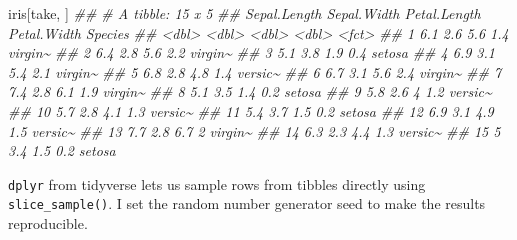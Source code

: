 \documentclass[
  notitlepage]{book}
\newenvironment{Shaded}{\begin{snugshade}}{\end{snugshade}}
\newcommand{\CommentTok}[1]{\textcolor[rgb]{0.56,0.35,0.01}{\textit{#1}}}
\newcommand{\NormalTok}[1]{#1}
\begin{document}
\begin{Shaded}
\begin{Highlighting}[]
\NormalTok{iris[take, ]}
\CommentTok{\#\# \# A tibble: 15 x 5}
\CommentTok{\#\#    Sepal.Length Sepal.Width Petal.Length Petal.Width Species}
\CommentTok{\#\#           \textless{}dbl\textgreater{}       \textless{}dbl\textgreater{}        \textless{}dbl\textgreater{}       \textless{}dbl\textgreater{} \textless{}fct\textgreater{}  }
\CommentTok{\#\#  1          6.1         2.6          5.6         1.4 virgin\textasciitilde{}}
\CommentTok{\#\#  2          6.4         2.8          5.6         2.2 virgin\textasciitilde{}}
\CommentTok{\#\#  3          5.1         3.8          1.9         0.4 setosa }
\CommentTok{\#\#  4          6.9         3.1          5.4         2.1 virgin\textasciitilde{}}
\CommentTok{\#\#  5          6.8         2.8          4.8         1.4 versic\textasciitilde{}}
\CommentTok{\#\#  6          6.7         3.1          5.6         2.4 virgin\textasciitilde{}}
\CommentTok{\#\#  7          7.4         2.8          6.1         1.9 virgin\textasciitilde{}}
\CommentTok{\#\#  8          5.1         3.5          1.4         0.2 setosa }
\CommentTok{\#\#  9          5.8         2.6          4           1.2 versic\textasciitilde{}}
\CommentTok{\#\# 10          5.7         2.8          4.1         1.3 versic\textasciitilde{}}
\CommentTok{\#\# 11          5.4         3.7          1.5         0.2 setosa }
\CommentTok{\#\# 12          6.9         3.1          4.9         1.5 versic\textasciitilde{}}
\CommentTok{\#\# 13          7.7         2.8          6.7         2   virgin\textasciitilde{}}
\CommentTok{\#\# 14          6.3         2.3          4.4         1.3 versic\textasciitilde{}}
\CommentTok{\#\# 15          5           3.4          1.5         0.2 setosa}
\end{Highlighting}
\end{Shaded}

\texttt{dplyr} from tidyverse lets us sample rows from tibbles directly using
\texttt{slice\_sample()}. I set the random number generator seed to make the
results reproducible.
\end{document}
